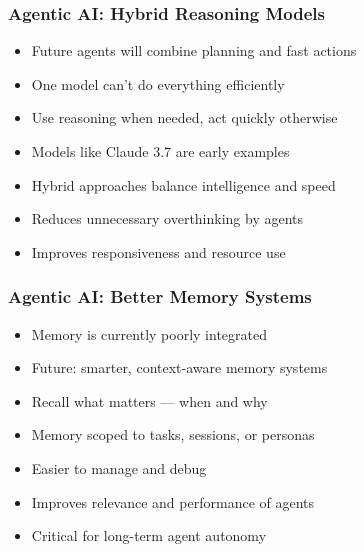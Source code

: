 \begin{frame}[fragile]\frametitle{Agentic AI: Hybrid Reasoning Models}

      \begin{itemize}
        \item Future agents will combine planning and fast actions
        \item One model can't do everything efficiently
        \item Use reasoning when needed, act quickly otherwise
        \item Models like Claude 3.7 are early examples
        \item Hybrid approaches balance intelligence and speed
        \item Reduces unnecessary overthinking by agents
        \item Improves responsiveness and resource use
      \end{itemize}
\end{frame}

\begin{frame}[fragile]\frametitle{Agentic AI: Better Memory Systems}

      \begin{itemize}
        \item Memory is currently poorly integrated
        \item Future: smarter, context-aware memory systems
        \item Recall what matters — when and why
        \item Memory scoped to tasks, sessions, or personas
        \item Easier to manage and debug
        \item Improves relevance and performance of agents
        \item Critical for long-term agent autonomy
      \end{itemize}

\end{frame}

